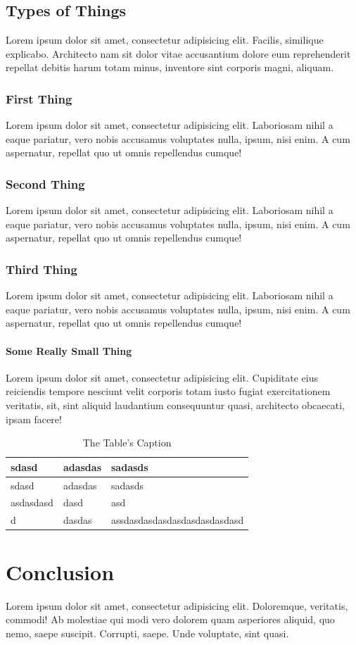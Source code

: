 \section{Types of Things}\label{types-of-things}

Lorem ipsum dolor sit amet, consectetur adipisicing elit. Facilis,
similique explicabo. Architecto nam sit dolor vitae accusantium dolore
eum reprehenderit repellat debitis harum totam minus, inventore sint
corporis magni, aliquam.

\subsection{First Thing}\label{first-thing}

Lorem ipsum dolor sit amet, consectetur adipisicing elit. Laboriosam
nihil a eaque pariatur, vero nobis accusamus voluptates nulla, ipsum,
nisi enim. A cum aspernatur, repellat quo ut omnis repellendus cumque!

\subsection{Second Thing}\label{second-thing}

Lorem ipsum dolor sit amet, consectetur adipisicing elit. Laboriosam
nihil a eaque pariatur, vero nobis accusamus voluptates nulla, ipsum,
nisi enim. A cum aspernatur, repellat quo ut omnis repellendus cumque!

\subsection{Third Thing}\label{third-thing}

Lorem ipsum dolor sit amet, consectetur adipisicing elit. Laboriosam
nihil a eaque pariatur, vero nobis accusamus voluptates nulla, ipsum,
nisi enim. A cum aspernatur, repellat quo ut omnis repellendus cumque!

\subsubsection{Some Really Small Thing}\label{some-really-small-thing}

Lorem ipsum dolor sit amet, consectetur adipisicing elit. Cupiditate
eius reiciendis tempore nesciunt velit corporis totam iusto fugiat
exercitationem veritatis, sit, sint aliquid laudantium consequuntur
quasi, architecto obcaecati, ipsam facere!

\begin{longtable}[]{@{}lll@{}}
\caption{The Table's Caption}\tabularnewline
\toprule
sdasd & adasdas & sadasds\tabularnewline
\midrule
\endfirsthead
\toprule
sdasd & adasdas & sadasds\tabularnewline
\midrule
\endhead
asdasdasd & dasd & asd\tabularnewline
d & dasdas & assdasdasdasdasdasdasdasdasd\tabularnewline
\bottomrule
\end{longtable}

\chapter{Conclusion}\label{conclusion}

Lorem ipsum dolor sit amet, consectetur adipisicing elit. Doloremque,
veritatis, commodi! Ab molestiae qui modi vero dolorem quam asperiores
aliquid, quo nemo, saepe suscipit. Corrupti, saepe. Unde voluptate, sint
quasi.
